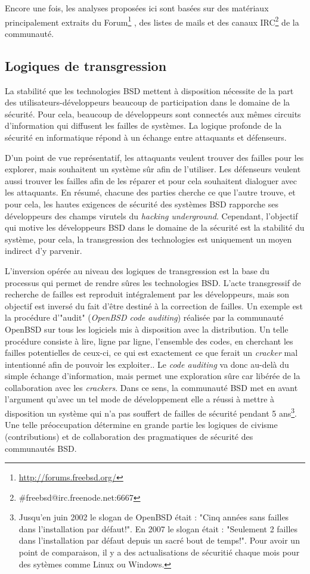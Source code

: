 Encore une fois, les analyses proposées ici sont basées sur des matériaux principalement extraits du Forum\footnote{\url{http://forums.freebsd.org/}} , des listes de mails et des canaux IRC\footnote{\#freebsd@irc.freenode.net:6667} de la communauté. 

\subsection{Logiques de transgression}\label{3.3.1}

La stabilité que les technologies BSD mettent à disposition nécessite de la part des utilisateurs-développeurs beaucoup de participation dans le domaine de la sécurité. Pour cela, beaucoup de développeurs sont connectés aux mêmes circuits d'information qui diffusent les failles de systèmes. La logique profonde de la sécurité en informatique répond à un échange entre attaquants et défenseurs.

D'un point de vue représentatif, les attaquants veulent trouver des failles pour les explorer, mais souhaitent un système sûr afin de l'utiliser. Les défenseurs veulent aussi trouver les failles afin de les réparer et pour cela souhaitent dialoguer avec les attaquants. En résumé, chacune des parties cherche ce que l'autre trouve, et pour cela, les hautes exigences de sécurité des systèmes BSD rapporche ses développeurs des champs virutels du \emph{hacking underground}. Cependant, l'objectif qui motive les développeurs BSD dans le domaine de la sécurité est la stabilité du système, pour cela, la transgression des technologies est uniquement un moyen indirect d'y parvenir.

L'inversion opérée au niveau des logiques de transgression est la base du processus qui permet de rendre sûres les technologies BSD. L'acte transgressif de recherche de failles est reproduit intégralement par les développeurs, mais son objectif est inversé du fait d'être destiné à la correction de failles. Un exemple est la procédure d'"audit" (\emph{OpenBSD code auditing}) réalisée par la communauté OpenBSD sur tous les logiciels mis à disposition avec la distribution. Un telle procédure consiste à lire, ligne par ligne, l'ensemble des codes, en cherchant les failles potentielles de ceux-ci, ce qui est exactement ce que ferait un \emph{cracker} mal intentionné afin de pouvoir les exploiter.. Le \emph{code auditing} va donc au-delà du simple échange d'information, mais permet une exploration sûre car libérée de la collaboration avec les \emph{crackers}. Dans ce sens, la communauté BSD met en avant l'argument qu'avec un tel mode de développement elle a réussi à mettre à disposition un système qui n'a pas souffert de failles de sécurité pendant 5 ans\footnote{Jusqu'en juin 2002 le slogan de OpenBSD était : "Cinq années sans failles dans l'installation par défaut!". En 2007 le slogan était : "Seulement 2 failles dans l'installation par défaut depuis un sacré bout de temps!". Pour avoir un point de comparaison, il y a des actualisations de sécuritié chaque mois pour des sytèmes comme Linux ou Windows.}. Une telle préoccupation détermine en grande partie les logiques de civisme (contributions) et de collaboration des pragmatiques de sécurité des communautés BSD.

